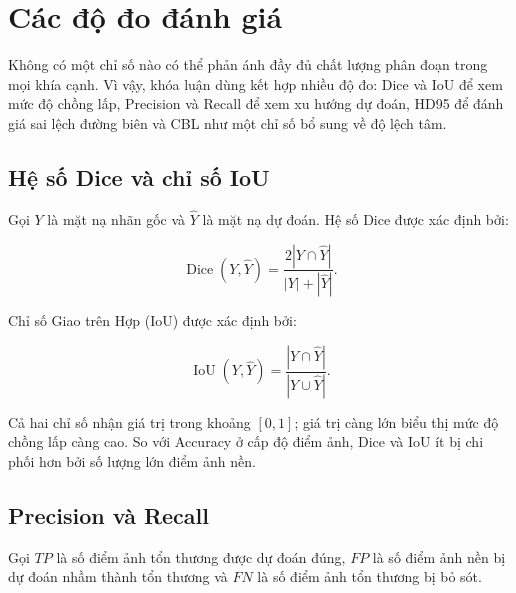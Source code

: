\section{Các độ đo đánh giá}
\label{sec:metrics}

Không có một chỉ số nào có thể phản ánh đầy đủ chất lượng phân đoạn trong mọi khía cạnh. Vì vậy, khóa luận dùng kết hợp nhiều độ đo: Dice và IoU để xem mức độ chồng lấp, Precision và Recall để xem xu hướng dự đoán, HD95 để đánh giá sai lệch đường biên và CBL như một chỉ số bổ sung về độ lệch tâm.

\subsection{Hệ số Dice và chỉ số IoU}
\label{subsec:dice_iou}

Gọi $Y$ là mặt nạ nhãn gốc và $\widehat{Y}$ là mặt nạ dự đoán. Hệ số Dice được xác định bởi:

\begin{equation}
    \operatorname{Dice}
    (Y,\widehat{Y})
    =
    \frac{
        2|Y\cap\widehat{Y}|
    }{
        |Y|+|\widehat{Y}|
    }.
    \label{eq:dice}
\end{equation}

Chỉ số Giao trên Hợp (IoU) được xác định bởi:

\begin{equation}
    \operatorname{IoU}
    (Y,\widehat{Y})
    =
    \frac{
        |Y\cap\widehat{Y}|
    }{
        |Y\cup\widehat{Y}|
    }.
    \label{eq:iou}
\end{equation}

Cả hai chỉ số nhận giá trị trong khoảng $[0,1]$; giá trị càng lớn biểu thị mức độ chồng lấp càng cao. So với Accuracy ở cấp độ điểm ảnh, Dice và IoU ít bị chi phối hơn bởi số lượng lớn điểm ảnh nền.

\subsection{Precision và Recall}
\label{subsec:precision_recall}

Gọi $TP$ là số điểm ảnh tổn thương được dự đoán đúng, $FP$ là số điểm ảnh nền bị dự đoán nhầm thành tổn thương và $FN$ là số điểm ảnh tổn thương bị bỏ sót.

